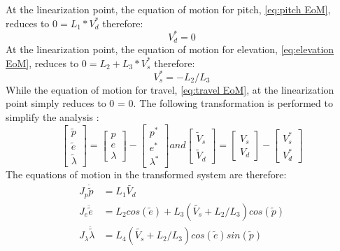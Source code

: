 At the linearization point, the equation of motion for pitch,
\cref{eq:pitch EoM}, reduces to $0 = L_{1} *
V^{*}_{d}$ therefore:
%
\begin{equation}
  \label{eq:V^*_d value}
  V^{*}_{d} = 0
\end{equation}
At the linearization point, the equation of motion for elevation,
\cref{eq:elevation EoM}, reduces to $0 = L_{2} +
L_{3}*V^{*}_{s}$ therefore:
%
\begin{equation}
  \label{eq:V^*_s value}
  V^{*}_{s} = -L_{2} / L_{3}
\end{equation}
%
While the equation of motion for travel, \cref{eq:travel EoM}, at the
linearization point simply reduces to 0 = 0.
The following transformation is performed to simplify the analysis
\cite[p.14]{assignment}:
%
\begin{equation}
  \label{eq:transformation}
  \begin{bmatrix}
    \tilde{p} \\
    \tilde{e} \\
    \tilde{\lambda}
  \end{bmatrix}
  =
  \begin{bmatrix}
    p \\
    e \\
    \lambda
  \end{bmatrix}
  -
  \begin{bmatrix}
    p^{*} \\
    e^{*} \\
    \lambda^{*}
  \end{bmatrix}
  and
  \begin{bmatrix}
    \tilde{V}_{s} \\
    \tilde{V}_{d}
  \end{bmatrix}
  =
  \begin{bmatrix}
    V_{s} \\
    V_{d}
  \end{bmatrix}
  -
  \begin{bmatrix}
    V^{*}_{s} \\
    V^{*}_{d}
  \end{bmatrix}
\end{equation}
%
The equations of motion in the transformed system are therefore:
%
\begin{subequations}
  \begin{align}
    J_p\ddot{\tilde{p}} &= L_1\tilde{V_d}
    \label{eq:transformed pitch EoM}\\
    J_e\ddot{\tilde{e}} &=
    L_2cos(\tilde{e}) + L_3(\tilde{V_s}+L_2/L_3)cos(\tilde{p})
    \label{eq:transformed elevation EoM}\\
    J_{\lambda}\ddot{\tilde{\lambda}} &=
    L_4(\tilde{V_s}+L_2/L_3)cos(\tilde{e})sin(\tilde{p})
    \label{eq:transformed travel EoM}
  \end{align}
\end{subequations}
